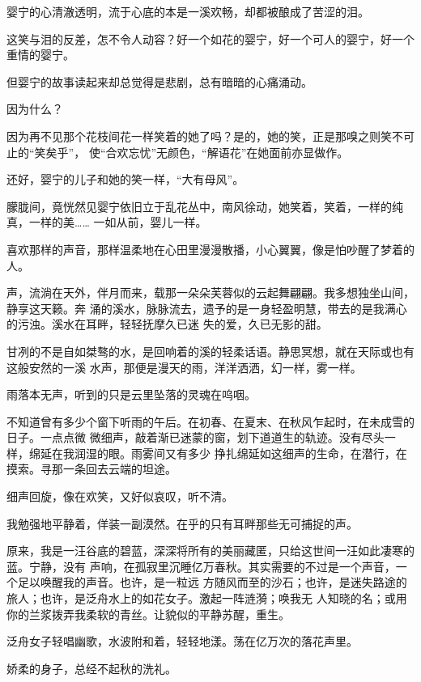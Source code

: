 \documentclass[12pt,a4paper]{article}
\begin{document}
		婴宁的心清澈透明，流于心底的本是一溪欢畅，却都被酿成了苦涩的泪。

		这笑与泪的反差，怎不令人动容？好一个如花的婴宁，好一个可人的婴宁，好一个重情的婴宁。

		但婴宁的故事读起来却总觉得是悲剧，总有暗暗的心痛涌动。

		因为什么？

		因为再不见那个花枝间花一样笑着的她了吗？是的，她的笑，正是那嗅之则笑不可止的“笑矣乎”，
	使“合欢忘忧”无颜色，“解语花”在她面前亦显做作。

		还好，婴宁的儿子和她的笑一样，“大有母风”。

		朦胧间，竟恍然见婴宁依旧立于乱花丛中，南风徐动，她笑着，笑着，一样的纯真，一样的美……
	一如从前，婴儿一样。

	\endwriting



		喜欢那样的声音，那样温柔地在心田里漫漫散播，小心翼翼，像是怕吵醒了梦着的人。

		声，流淌在天外，伴月而来，载那一朵朵芙蓉似的云起舞翩翩。我多想独坐山间，静享这天籁。奔
	涌的溪水，脉脉流去，遗予的是一身轻盈明慧，带去的是我满心的污浊。溪水在耳畔，轻轻抚摩久已迷
	失的爱，久已无影的甜。

		甘冽的不是自如桀骜的水，是回响着的溪的轻柔话语。静思冥想，就在天际或也有这般安然的一溪
	水声，那便是漫天的雨，洋洋洒洒，幻一样，雾一样。

		雨落本无声，听到的只是云里坠落的灵魂在呜咽。

		不知道曾有多少个窗下听雨的午后。在初春、在夏末、在秋风乍起时，在未成雪的日子。一点点微
	微细声，敲着渐已迷蒙的窗，划下道道生的轨迹。没有尽头一样，绵延在我润湿的眼。雨雾间又有多少
	挣扎绵延如这细声的生命，在潜行，在摸索。寻那一条回去云端的坦途。

		细声回旋，像在欢笑，又好似哀叹，听不清。

		我勉强地平静着，佯装一副漠然。在乎的只有耳畔那些无可捕捉的声。

		原来，我是一汪谷底的碧蓝，深深将所有的美丽藏匿，只给这世间一汪如此凄寒的蓝。宁静，没有
	声响，在孤寂里沉睡亿万春秋。其实需要的不过是一个声音，一个足以唤醒我的声音。也许，是一粒远
	方随风而至的沙石；也许，是迷失路途的旅人；也许，是泛舟水上的如花女子。激起一阵涟漪；唤我无
	人知晓的名；或用你的兰浆拨弄我柔软的青丝。让貌似的平静苏醒，重生。

		泛舟女子轻唱幽歌，水波附和着，轻轻地漾。荡在亿万次的落花声里。

		娇柔的身子，总经不起秋的洗礼。
\end{document}
